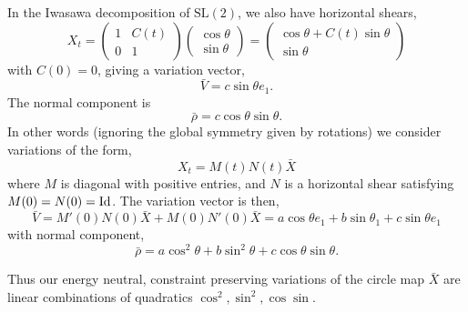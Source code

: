 \documentclass[12pt]{article}
\begin{document}
In the Iwasawa decomposition of \(\text{SL}(2)\), we also have horizontal shears,
\[
X_t = 
\begin{pmatrix}
1 & C(t) \\
0 & 1
\end{pmatrix}
\begin{pmatrix}
\cos \theta \\
\sin \theta
\end{pmatrix}
=
\begin{pmatrix}
\cos\theta + C(t) \sin\theta \\
\sin\theta
\end{pmatrix}
\]
with \(C(0) = 0\), giving a variation vector,
\[
\bar{V} = c \sin\theta e_1.
\]
The normal component is
\[
\bar{\rho} = c \cos\theta \sin\theta.
\]
In other words (ignoring the global symmetry given by rotations) we consider variations of the form,
\[
X_t = M(t) N(t) \bar{X}
\]
where \(M\) is diagonal with positive entries, and \(N\) is a horizontal shear satisfying \(M(0) = N(0) = \operatorname{Id}\). The variation vector is then,
\[
\bar{V} = M'(0) N(0) \bar{X} + M(0) N'(0) \bar{X} = a \cos\theta e_1 + b \sin\theta_1 + c \sin\theta e_1
\]
with normal component,
\[
\bar{\rho} = a \cos^2\theta + b \sin^2 \theta + c \cos\theta \sin\theta.
\]

Thus our energy neutral, constraint preserving variations of the circle map \(\bar{X}\) are linear combinations of quadratics \(\cos^2, \sin^2, \cos \sin\).
\end{document}
